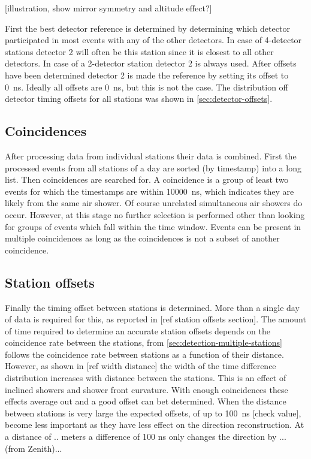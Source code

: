 [illustration, show mirror symmetry and altitude effect?]

First the best detector reference is determined by determining which detector participated in most events with any of the other detectors. In case of 4-detector stations detector 2 will often be this station since it is closest to all other detectors. In case of a 2-detector station detector 2 is always used. After offsets have been determined detector 2 is made the reference by setting its offset to \SI{0}{\ns}. Ideally all offsets are \SI{0}{\ns}, but this is not the case. The distribution off detector timing offsets for all \hisparc stations was shown in \cref{sec:detector-offsets}.


\subsection{Coincidences}

After processing data from individual stations their data is combined. First the processed events from all stations of a day are sorted (by timestamp) into a long list. Then coincidences are searched for. A coincidence is a group of least two events for which the \gps timestamps are within \SI{10000}{\ns}, which indicates they are likely from the same air shower. Of course unrelated simultaneous air showers do occur. However, at this stage no further selection is performed other than looking for groups of events which fall within the time window. Events can be present in multiple coincidences as long as the coincidences is not a subset of another coincidence.


\subsection{Station offsets}

Finally the timing offset between stations is determined. More than a single day of data is required for this, as reported in [ref station offsets section]. The amount of time required to determine an accurate station offsets depends on the coincidence rate between the stations, from \cref{sec:detection-multiple-stations} follows the coincidence rate between stations as a function of their distance. However, as shown in [ref width distance] the width of the time difference distribution increases with distance between the stations. This is an effect of inclined showers and shower front curvature. With enough coincidences these effects average out and a good offset can bet determined. When the distance between stations is very large the expected \gps offsets, of up to \SI{100}{\ns} [check value], become less important as they have less effect on the direction reconstruction. At a distance of .. meters a difference of 100 ns only changes the direction by ... (from Zenith)...

